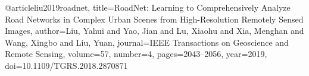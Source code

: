 @article{liu2019roadnet,
  title={RoadNet: Learning to Comprehensively Analyze Road Networks in Complex Urban Scenes from High-Resolution Remotely Sensed Images},
  author={Liu, Yahui and Yao, Jian and Lu, Xiaohu and Xia, Menghan and Wang, Xingbo and Liu, Yuan},
  journal={IEEE Transactions on Geoscience and Remote Sensing},
  volume={57},
  number={4},
  pages={2043--2056},
  year={2019},
  doi={10.1109/TGRS.2018.2870871}
}
